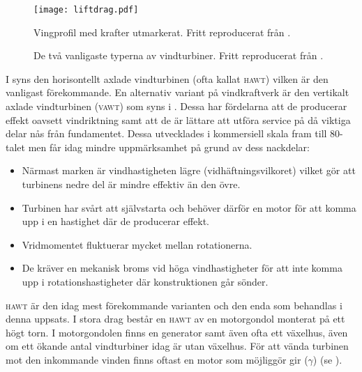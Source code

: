     \begin{figure}[!htb]
      \centering
      \texttt{[image: liftdrag.pdf]}
      \caption{Vingprofil med krafter utmarkerat.  Fritt reproducerat från \citet{hansen}.}
      \label{liftdrag}
    \end{figure}

\begin{figure}[!htb]
  \centering
  \caption{De två vanligaste typerna av vindturbiner. Fritt reproducerat från \citet{wehb}.}
  \label{hawtvawt}
\end{figure}


I  syns den horisontellt axlade vindturbinen (ofta kallat \textsc{hawt}) vilken är den vanligast förekommande. En alternativ variant på vindkraftverk är den vertikalt axlade vindturbinen (\textsc{vawt}) som syns i . Dessa har fördelarna att de producerar effekt oavsett vindriktning samt att de är lättare att utföra service på då viktiga delar nås från fundamentet. Dessa utvecklades i kommersiell skala fram till 80-talet men får idag mindre uppmärksamhet på grund av dess nackdelar:

    \begin{itemize}
    
      \item Närmast marken är vindhastigheten lägre (vidhäftningsvilkoret) vilket gör att turbinens nedre del är mindre effektiv än den övre.
    
      \item Turbinen har svårt att självstarta och behöver därför en motor för att komma upp i en hastighet där de producerar effekt.
      
      \item Vridmomentet fluktuerar mycket mellan rotationerna.
      
      \item De kräver en mekanisk broms vid höga vindhastigheter för att inte komma upp i rotationshastigheter där konstruktionen går sönder.
     
    \end{itemize}


\textsc{hawt} är den idag mest förekommande varianten och den enda som behandlas i denna uppsats. I stora drag består en \textsc{hawt} av en motorgondol monterat på ett högt torn. I motorgondolen finns en generator samt även ofta ett växelhus, även om ett ökande antal vindturbiner idag är utan växelhus. För att vända turbinen mot den inkommande vinden finns oftast en motor som möjliggör gir ($\gamma$) (se ). 

